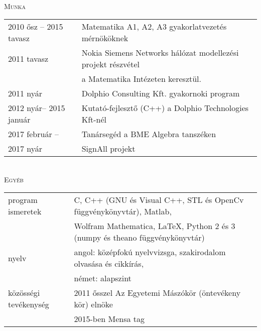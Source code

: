 \documentclass[12pt]{article}
\begin{document}
	\vspace{0.3cm}
 \\
 \textsc{Munka}
 \vspace{0.3cm}
 \\
       \begin{tabular}{p{4cm}l}
	       2010 ősz -- 2015 tavasz & Matematika A1, A2, A3 gyakorlatvezetés mérnököknek\\
           2011 tavasz  & Nokia Siemens Networks hálózat modellezési projekt részvétel\\ & a Matematika Intézeten keresztül. \\
		   2011 nyár    & Dolphio Consulting Kft. gyakornoki program\\
		   2012 nyár-- 2015 január & Kutató-fejlesztő (C++) a Dolphio Technologies Kft-nél \\
           2017 február -- & Tanársegéd a BME Algebra tanszéken \\
           2017 nyár & SignAll projekt
       \end{tabular}
 \vspace{0.3cm}
 \\
 \textsc{Egyéb}
 \vspace{0.3cm}
 \\
        \begin{tabular}{p{3cm}l}
	       program ismeretek &  C, C++ (GNU és Visual C++, STL és OpenCv függvénykönyvtár), Matlab, \\
                             & Wolfram Mathematica, \LaTeX, Python 2 és 3 (numpy és theano függvénykönyvtár) \\
           nyelv & angol: középfokú nyelvvizsga, szakirodalom olvasása és cikkírás, \\
                 & német: alapszint\\
		   közösségi tevékenység  & 2011 ősszel Az Egyetemi Mászókör (öntevékeny kör) elnöke \\
                                  & 2015-ben Mensa tag
       \end{tabular}
\end{document}
